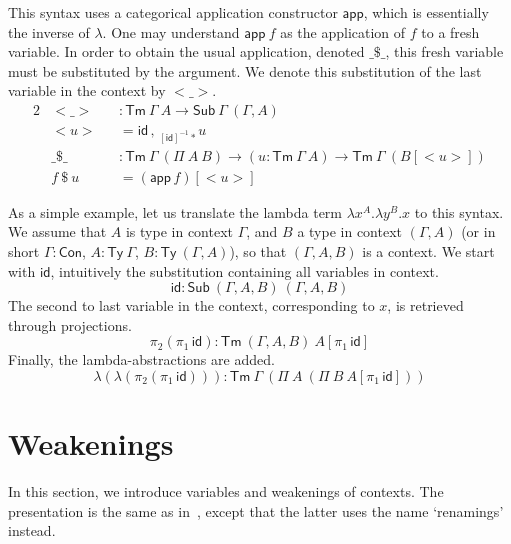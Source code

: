 \documentclass[a4paper,UKenglish,cleveref]{lipics-v2019}
\newcommand{\agdaSymb}[1]{\mathsf{#1}}
\newcommand{\Ty}{\agdaSymb{Ty}}
\newcommand{\Con}{\agdaSymb{Con}}
\newcommand{\Tms}{\agdaSymb{Sub}}
\newcommand{\Tm}{\agdaSymb{Tm}}
\newcommand{\id}{\agdaSymb{id}}
\newcommand{\app}{\agdaSymb{app}}
\newcommand{\lam}{\lambda}
\begin{document}
This syntax uses a categorical application constructor $\app$, which is
essentially the inverse of $\lam$. One may understand $\app\ f$ as the
application of $f$ to a fresh variable. In order to obtain the usual
application, denoted $\_\$\_$, this fresh variable must be substituted by the
argument. We denote this substitution of the last variable in the context by
$<\_>$.
\begin{alignat*}{2}
  & <\_> && : \Tm\ \Gamma\ A \to \Tms\ \Gamma\ (\Gamma,A) \\ & <u> && = \id\,,\,_{[\id]^{-1} *}u \\
  & \_\$\_ && : \Tm\ \Gamma\ (\Pi\ A\ B) \to (u : \Tm\ \Gamma\ A) \to \Tm\ \Gamma\ (B[<u>]) \\
  & f\ \$\ u && = (\app\, f)[<u>]
\end{alignat*}

As a simple example, let us translate the lambda term $\lambda x^A . \lambda
y^B . x$ to this syntax. We assume that $A$ is type in context $\Gamma$, and
$B$ a type in context $(\Gamma,A)$ (or in short $\Gamma:\Con$, $A:\Ty\ \Gamma$,
$B:\Ty\ (\Gamma,A)$), so that $(\Gamma,A,B)$ is a context.
We start with $\id$, intuitively the substitution containing all variables in
context.
\[ \id : \Tms\ (\Gamma,A,B)\ (\Gamma,A,B) \]
The second to last variable in the context, corresponding to $x$, is retrieved
through projections.
\[ \pi_2 (\pi_1\,\id) : \Tm\ (\Gamma,A,B)\ A[\pi_1\,\id] \]
Finally, the lambda-abstractions are added.
\[ \lam (\lam (\pi_2 (\pi_1\,\id))) : \Tm\ \Gamma\ (\Pi\ A\ (\Pi\ B\ A[\pi_1\,\id])) \]

\section{Weakenings}
\label{sec:weakening}
In this section, we introduce variables and weakenings of contexts. The
presentation is the same as in~\cite{kaposi2016normalisation}, except that the
latter uses the name `renamings' instead.
\end{document}
